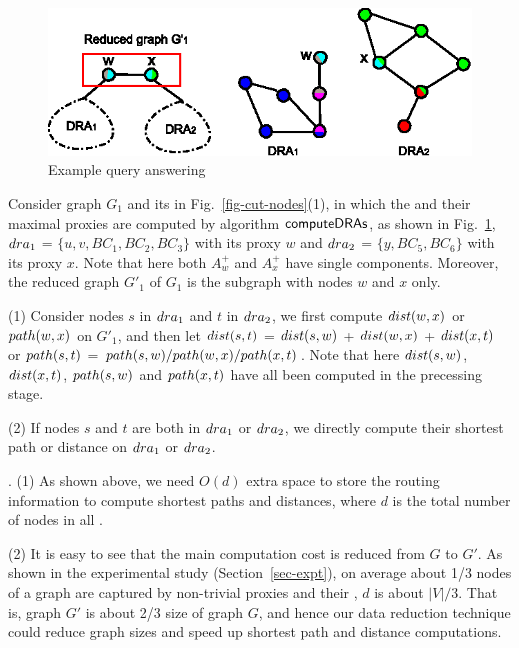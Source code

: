 \begin{figure}[tb!]
\begin{center}
\includegraphics[scale=0.9]{./Example-framework.eps}
\end{center}
\vspace{-2ex}
\caption{Example query answering}
  \label{fig-query-answering}\vspace{-3ex}
\end{figure}

\begin{example}
\label{exm-query}
Consider graph $G_1$ and its \bccs in Fig.~\ref{fig-cut-nodes}(1), in which the \dras and their maximal proxies are computed by algorithm ${\mathsf{computeDRAs}}$, as shown in Fig.~\ref{fig-query-answering}, \ie\ ${\sc dra}_1$ = $\{u, v, BC_1, BC_2, BC_3\}$ with its proxy $w$ and ${\sc dra}_2$ = $\{y, BC_5, BC_6\}$ with its proxy $x$. Note that here both $A^{+}_w$ and $A^{+}_x$ have single components. Moreover, the reduced graph $G'_1$ of $G_1$  is the subgraph with nodes $w$ and $x$ only.




\sstab(1) Consider nodes $s$ in ${\sc dra}_1$  and $t$ in ${\sc dra}_2$, we first compute $\dist(w, x)$ or $\path(w,x)$ on $G'_1$, and then 
let $\dist(s, t)$ = $\dist(s, w)$ + $\dist(w, x)$ + $\dist(x, t)$ or $\path(s, t)$ = $\path(s, w)/\path(w, x)/\path(x, t)$.
Note that here $\dist(s, w)$, $\dist(x, t)$, $\path(s, w)$ and $\path(x, t)$ have all been computed in the precessing stage.


\sstab(2) If nodes $s$ and $t$ are both in ${\sc dra}_1$  or ${\sc dra}_2$, we directly compute their shortest path or distance on  ${\sc dra}_1$  or ${\sc dra}_2$.
\end{example}

\vspace{-1ex}
.
(1) As shown above, we need $O(d)$ extra space to store the routing information to compute shortest paths and distances, where $d$ is the total number of nodes in all \dras.

\sstab (2) It is easy to see that the main computation cost is reduced from $G$ to $G'$. As shown in the experimental study (Section~\ref{sec-expt}), on average about 1/3 nodes of a graph are captured by non-trivial proxies and their \dras, \ie $d$ is about $|V|/3$. That is, graph $G'$ is about 2/3 size of graph $G$, and hence our data reduction technique could reduce graph sizes and speed up shortest path and distance computations. 
